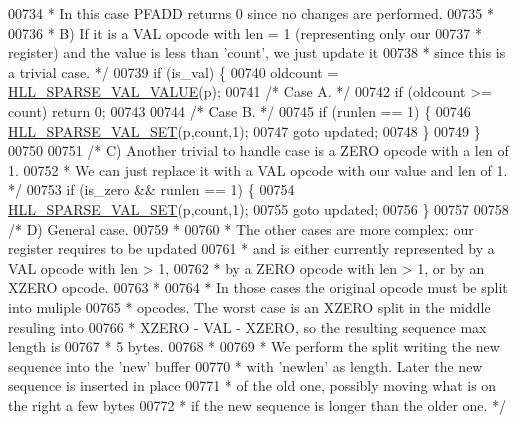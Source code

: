 \begin{DoxyCode}
{{00734 \textcolor{comment}{     *    In this case PFADD returns 0 since no changes are performed.}
00735 \textcolor{comment}{     *}
00736 \textcolor{comment}{     * B) If it is a VAL opcode with len = 1 (representing only our}
00737 \textcolor{comment}{     *    register) and the value is less than 'count', we just update it}
00738 \textcolor{comment}{     *    since this is a trivial case. */}
00739     \textcolor{keywordflow}{if} (is\_val) \{
00740         oldcount = \hyperlink{hyperloglog_8c_ad36de263468a9ce3b1409743b8da64d7}{HLL\_SPARSE\_VAL\_VALUE}(p);
00741         \textcolor{comment}{/* Case A. */}
00742         \textcolor{keywordflow}{if} (oldcount >= count) \textcolor{keywordflow}{return} 0;
00743 
00744         \textcolor{comment}{/* Case B. */}
00745         \textcolor{keywordflow}{if} (runlen == 1) \{
00746             \hyperlink{hyperloglog_8c_a27a040f2d48978974a593fdc306241f9}{HLL\_SPARSE\_VAL\_SET}(p,count,1);
00747             \textcolor{keywordflow}{goto} updated;
00748         \}
00749     \}
00750 
00751     \textcolor{comment}{/* C) Another trivial to handle case is a ZERO opcode with a len of 1.}
00752 \textcolor{comment}{     * We can just replace it with a VAL opcode with our value and len of 1. */}
00753     \textcolor{keywordflow}{if} (is\_zero && runlen == 1) \{
00754         \hyperlink{hyperloglog_8c_a27a040f2d48978974a593fdc306241f9}{HLL\_SPARSE\_VAL\_SET}(p,count,1);
00755         \textcolor{keywordflow}{goto} updated;
00756     \}
00757 
00758     \textcolor{comment}{/* D) General case.}
00759 \textcolor{comment}{     *}
00760 \textcolor{comment}{     * The other cases are more complex: our register requires to be updated}
00761 \textcolor{comment}{     * and is either currently represented by a VAL opcode with len > 1,}
00762 \textcolor{comment}{     * by a ZERO opcode with len > 1, or by an XZERO opcode.}
00763 \textcolor{comment}{     *}
00764 \textcolor{comment}{     * In those cases the original opcode must be split into muliple}
00765 \textcolor{comment}{     * opcodes. The worst case is an XZERO split in the middle resuling into}
00766 \textcolor{comment}{     * XZERO - VAL - XZERO, so the resulting sequence max length is}
00767 \textcolor{comment}{     * 5 bytes.}
00768 \textcolor{comment}{     *}
00769 \textcolor{comment}{     * We perform the split writing the new sequence into the 'new' buffer}
00770 \textcolor{comment}{     * with 'newlen' as length. Later the new sequence is inserted in place}
00771 \textcolor{comment}{     * of the old one, possibly moving what is on the right a few bytes}
00772 \textcolor{comment}{     * if the new sequence is longer than the older one. */}
}}
\end{DoxyCode}
